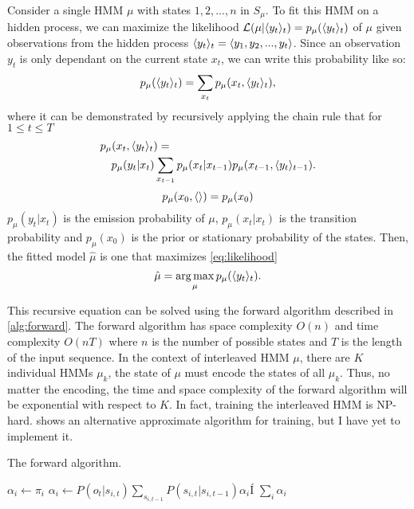 Consider a single HMM \(\mu\) with states \(1, 2, ...,n\) in \(S_\mu\). To fit
this HMM on a hidden process, we can maximize the likelihood \(\mathcal{L}(\mu |
\langle y_t\rangle_t) = p_\mu(\langle y_t\rangle_t)\) of \(\mu\) given observations from the
hidden process \(\langle y_t\rangle_t = \langle y_1, y_2, ..., y_t\rangle\). Since an observation
\(y_t\) is only dependant on the current state \(x_t\), we can write this
probability like so:
\begin{equation}\label{eq:likelihood}
    p_\mu(\langle y_t\rangle_t) = \sum_{x_t} p_\mu(x_t, \langle y_t\rangle_t),
\end{equation}
where it can be demonstrated by recursively applying the chain rule that for \(1
\leq t \leq T\)
\begin{equation}
    \begin{multlined}
        p_\mu(x_t, \seq{y_t}_t) = \\
        p_\mu(y_t|x_t) \sum_{x_{t-1}} p_\mu(x_t|x_{t-1}) p_\mu(x_{t-1}, \seq{y_t}_{t-1}).
    \end{multlined}
\end{equation}
\begin{equation}\label{eq:max_likelihood}
    p_\mu(x_0, \langle\rangle) = p_\mu(x_0)
\end{equation}
\(p_\mu(y_t|x_t)\) is the emission probability of \(\mu\), \(p_\mu(x_t | x_t)\)
is the transition probability and \(p_\mu(x_0)\) is the prior or stationary
probability of the states. Then, the fitted model \(\hat{\mu}\) is one that maximizes \cref{eq:likelihood}
\begin{equation}
    \label{eq:argmax_observation}
    \hat{\mu} = \operatorname*{arg\,max}_{\mu} p_\mu(\langle y_t\rangle_t).
\end{equation}

This recursive equation can be solved using the forward algorithm described in
\cref{alg:forward}. The forward algorithm has space complexity \(O(n)\)  and
time complexity \(O(nT)\) where \(n\) is the number of possible states and \(T\)
is the length of the input sequence. In the context of interleaved HMM \(\mu\),
there are \(K\) individual HMMs \(\mu_k\), the state of \(\mu\) must encode the
states of all \(\mu_k\). Thus, no matter the encoding, the time and space
complexity of the forward algorithm will be exponential with respect to \(K\).
In fact, training the interleaved HMM is NP-hard\cite{Landwehr2008-vw}.
\citeauthor{Landwehr2008-vw} shows an alternative approximate algorithm for
training, but I have yet to implement it.
\begin{algorithm}[H]
    \caption{The forward algorithm.}\label{alg:forward}
    \begin{algorithmic}[1]
        \State $\alpha_i \gets \pi_i$
        \EndFor
        \State $\alpha_i \gets P(o_t|s_{i,t}) \sum_{s_{i, t-1}} P(s_{i, t} | s_{i, t-1}) \alpha_i$Í
        \EndFor
        \EndFor
        \State \Return $\sum_{i} \alpha_i$
        \EndFunction
    \end{algorithmic}
\end{algorithm}

